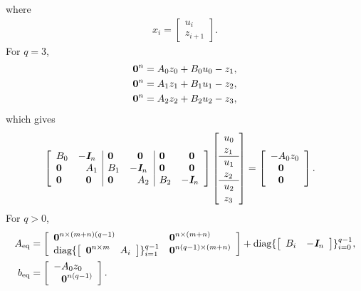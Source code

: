 \documentclass{article}
\begin{document}
    where
    \begin{align*}
    x_i =
        \left[\begin{array}{l}
            u_i
            \\
            z_{i+1}
        \end{array}\right].
    \end{align*}
    For $q=3$,
    \begin{align*}
        \textbf{0}^{n} &= A_0 z_0 + B_0 u_0 - z_1,   \\
        \textbf{0}^{n} &= A_1 z_1 + B_1 u_1 - z_2,   \\
        \textbf{0}^{n} &= A_2 z_2 + B_2 u_2 - z_3,
    \end{align*}
    which gives
    \begin{align*}
        \left[\begin{array}{ll|ll|ll}
                    B_0
                &
                    -\eye_n
                &
                    \zeros 
                &
                    \minus \zeros
                &
                    \zeros
                &
                    \minus \zeros
            \\
                    \zeros
                &
                    \minus A_1
                &
                    B_1                   
                &
                    -\eye_n
                &
                    \zeros
                &
                    \minus \zeros
            \\
                    \zeros
                &
                    \minus \zeros
                &
                    \zeros  
                &
                    \minus A_2
                &
                    B_2
                &
                    -\eye_n
        \end{array}
            \right]
        \mat{
            u_0\\
            z_1\\\hline
            u_1\\
            z_2\\\hline
            u_2\\
            z_3
            }&=\mat{
                -A_0z_0\\
                \minus \zeros\\
                \minus \zeros
            }.
    \end{align*}
    For $q>0$,
    \begin{align*}
        A_\eq&=\mat{\zeros^{n\times (m+n)(q-1)} & \zeros^{n\times (m+n)} \\
        \diag\{\mat{\zeros^{n\times m}&A_i}\}_{i=1}^{q-1} & \zeros^{n(q-1)\times(m+n)} }+
        \diag\{\mat{B_i&-\eye_n}\}_{i=0}^{q-1},\\
        b_\eq&=\mat{-A_0z_0\\
        \minus\zeros^{n(q-1)}}.
    \end{align*}
\end{document}
